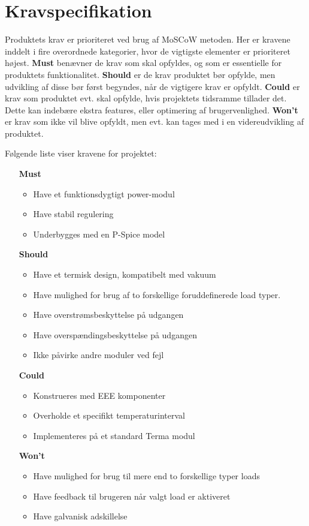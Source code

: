 \chapter{Kravspecifikation}

Produktets krav er prioriteret ved brug af MoSCoW metoden. Her er kravene inddelt i fire overordnede kategorier, hvor de vigtigste elementer er prioriteret højest. \textbf{Must} benævner de krav som skal opfyldes, og som er essentielle for produktets funktionalitet. \textbf{Should} er de krav produktet bør opfylde, men udvikling af disse bør først begyndes, når de vigtigere krav er opfyldt. \textbf{Could} er krav som produktet evt. skal opfylde, hvis projektets tidsramme tillader det. Dette kan indebære ekstra features, eller optimering af brugervenlighed. \textbf{Won't} er krav som ikke vil blive opfyldt, men evt. kan tages med i en videreudvikling af produktet.

\noindent Følgende liste viser kravene for projektet:
\begin{itemize}
	\item[\textbf{Must}]
	\begin{itemize}
		\item Have et funktionsdygtigt power-modul
		\item Have stabil regulering
		\item Underbygges med en P-Spice model
		
	\end{itemize}
	\item[\textbf{Should}]
	\begin{itemize}
		\item Have et termisk design, kompatibelt med vakuum
		\item Have mulighed for brug af to forskellige foruddefinerede load typer.
		\item Have overstrømsbeskyttelse på udgangen
		\item Have overspændingsbeskyttelse på udgangen
		\item Ikke påvirke andre moduler ved fejl
		
	\end{itemize}
	\item[\textbf{Could}] 
	\begin{itemize}
		\item Konstrueres med EEE komponenter
		\item Overholde et specifikt temperaturinterval
		\item Implementeres på et standard Terma modul 
		
	\end{itemize}
	\item[\textbf{Won't}]
	\begin{itemize}
		\item Have mulighed for brug til mere end to forskellige typer loads
		\item Have feedback til brugeren når valgt load er aktiveret
		\item Have galvanisk adskillelse
		
	\end{itemize}
\end{itemize}

